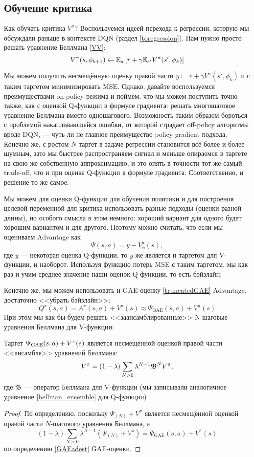 \subsection{Обучение критика}

Как обучать критика $V^\pi$? Воспользуемся идеей перехода к регрессии, которую мы обсуждали раньше в контексте DQN (раздел \ref{toregression}). Нам нужно просто решать уравнение Беллмана \eqref{VV}:
$$V^\pi(s, \phi_{k+1}) \leftarrow \mathbb{E}_{a} \left[ r + \gamma \mathbb{E}_{s'} V^\pi(s', \phi_k) \right]$$

Мы можем получить несмещённую оценку правой части $y \coloneqq r + \gamma V^\pi(s', \phi_k)$ и с таким таргетом минимизировать MSE. Однако, давайте воспользуемся преимуществами on-policy режима и поймём, что мы можем поступить точно также, как с оценкой Q-функции в формуле градиента: решать многошаговое уравнение Беллмана вместо одношагового. Возможность таким образом бороться с проблемой накапливающейся ошибки, от которой страдает off-policy алгоритмы вроде DQN, --- чуть ли не главное преимущество policy gradient подхода. Конечно же, с ростом $N$ таргет в задаче регрессии становится всё более и более шумным, зато мы быстрее распространяем сигнал и меньше опираемся в таргете на свою же собственную аппроксимацию, и это опять в точности тот же самый trade-off, что и при оценке Q-функции в формуле градиента. Соответственно, и решение то же самое.

Мы можем для оценки Q-функции для обучения политики и для построения целевой переменной для критика использовать разные подходы (оценки разной длины), но особого смысла в этом немного: хороший вариант для одного будет хорошим вариантом и для другого. Поэтому можно считать, что если мы оцениваем Advantage как
$$\Psi(s, a) = y - V_{\phi}^{\pi}(s),$$
где $y$ --- некоторая оценка Q-функции, то $y$ же является и таргетом для V-функции, и наоборот. Используя функцию потерь MSE с таким таргетом, мы как раз и учим среднее значение наши оценок Q-функции, то есть бэйзлайн.

Конечно же, мы можем использовать и GAE-оценку \eqref{truncatedGAE} Advantage, достаточно <<убрать бэйзлайн>>:
$$Q^\pi(s, a) = A^\pi(s, a) + V^\pi(s) \approx \Psi_{\mathrm{GAE}}(s, a) + V^\pi(s)$$
При этом мы как бы будем решать <<заансамблированные>> N-шаговые уравнения Беллмана для V-функции: 

\begin{proposition}
Таргет $\Psi_{\mathrm{GAE}}(s, a) \HM+ V^\pi(s)$ является несмещённой оценкой правой части <<ансамбля>> уравнений Беллмана:
$$V^{\pi} = (1 - \lambda) \sum_{N > 0} \lambda^{N-1} \mathfrak{B}^N V^{\pi},$$
где $\mathfrak{B}$ --- оператор Беллмана для V-функции (мы записывали аналогичное уравнение \eqref{bellman_ensemble} для Q-функции)
\begin{proof}
По определению, поскольку $\Psi_{(N)} + V^{\pi}$ является несмещённой оценкой правой части $N$-шагового уравнения Беллмана, а
$$(1 - \lambda) \sum_{N > 0} \lambda^{N-1} (\Psi_{(N)} + V^{\pi}) = \Psi_{\mathrm{GAE}}(s, a) + V^\pi(s)$$
по определению \eqref{GAEadest} GAE-оценки.
\end{proof}
\end{proposition}


